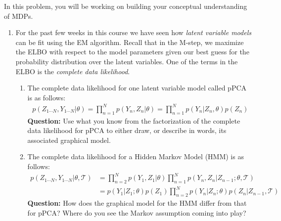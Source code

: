\documentclass[submit]{harvardml}
\begin{document}
\begin{problem}
In this problem, you will be working on building your conceptual understanding of MDPs.

\begin{enumerate}
    \item For the past few weeks in this course we have seen how \textit{latent variable models} can be fit using the EM algorithm. Recall that in the M-step, we maximize the ELBO with respect to the model parameters given our best guess for the probability distribution over the latent variables. One of the terms in the ELBO is the \textit{complete data likelihood}.
    \begin{enumerate}
        \item  The complete data likelihood for one latent variable model called pPCA is as follows:
    \begin{align*}
        p(Z_{1\cdots N}, Y_{1\cdots N}|\theta) = \prod_{n=1}^N p(Y_n, Z_n|\theta) = \prod_{n=1}^N p(Y_n|Z_n, \theta)p(Z_n)
    \end{align*}
    \textbf{Question:} Use what you know from the factorization of the complete data likelihood for pPCA to either draw, or describe in words, its associated graphical model.
    \item The complete data likelihood for a Hidden Markov Model (HMM) is as follows:
    \begin{align*}
        p(Z_{1\cdots N}, Y_{1\cdots N}|\theta, \mathcal{T}) &= \prod_{n=2}^N p(Y_1, Z_1|\theta)\prod_{n=1}^N p(Y_n, Z_n|Z_{n-1}; \theta, \mathcal{T})\\
        &= p(Y_1|Z_1; \theta)p(Z_1)\prod_{n=2}^N p(Y_n|Z_n;\theta)p(Z_n|Z_{n-1}, \mathcal{T})
    \end{align*}
    \textbf{Question:} How does the graphical model for the HMM differ from that for pPCA? Where do you see the Markov assumption coming into play?
    \end{enumerate}



\end{enumerate}
\end{problem}
\end{document}
